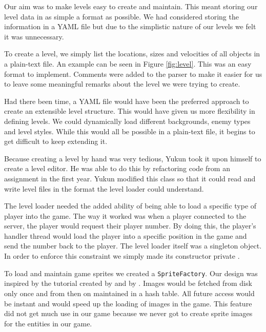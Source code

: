 Our aim was to make levels easy to create and maintain. This meant
storing our level data in as simple a format as possible. We had
considered storing the information in a YAML file but due to the
simplistic nature of our levels we felt it was unnecessary.

To create a level, we simply list the locations, sizes and velocities
of all objects in a plain-text file. An example can be seen in Figure
\ref{fig:level}. This was an easy format to implement. Comments were
added to the parser to make it easier for us to leave some meaningful
remarks about the level we were trying to create.

Had there been time, a YAML file would have been the preferred
approach to create an extensible level structure. This would have
given us more flexibility in defining levels. We could dynamically load
different backgrounds, enemy types and level styles. While this would
all be possible in a plain-text file, it begins to get difficult to
keep extending it.

Because creating a level by hand was very tedious, Yukun took it upon
himself to create a level editor. He was able to do this by
refactoring code from an assignment in the first year. Yukun modified
this class so that it could read and write level files in the format
the level loader could understand.

The level loader needed the added ability of being able to load a
specific type of player into the game. The way it worked was when a
player connected to the server, the player would request their player
number. By doing this, the player's handler thread would load the
player into a specific position in the game and send the number back
to the player. The level loader itself was a singleton object. In
order to enforce this constraint we simply made its constructor
private \cite{bloch2008}.

To load and maintain game sprites we created a
\texttt{SpriteFactory}. Our design was inspired by the tutorial
created by \cite{coke_and_coke:website} and by \cite{gof1994}. Images
would be fetched from disk only once and from then on maintained in a
hash table. All future access would be instant and would speed up the
loading of images in the game. This feature did not get much use in
our game because we never got to create sprite images for the entities
in our game.

